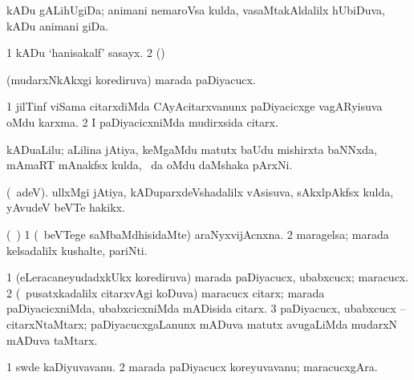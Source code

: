 {{{{{{{\bentry
{} 
\gl{\nA}
\expl{}
\bmng
{} 
\emng
\eentry

\bentry
{} 
\gl{\nA}
\expl{}
\bmng
kADu gALihUgiDa; animani nemaroVsa kulda, vasaMtakAldalilx hUbiDuva, kADu animani giDa. 
\emng
\eentry

\bentry
{} 
\gl{\nA}
\expl{}
\bmng
{} 
\emng
\eentry

\bentry
{} 
\gl{\nA}
\expl{}
\bmng
\bnum
\num{1} kADu `hanisakalf' sasayx. 
\num{2} (\ame)  
\enum
\emng
\eentry

\bentry 
{} 
\gl{\nA}
\expl{}
\bmng
(mudarxNkAkxgi korediruva) marada paDiyacucx. 
\emng
\eentry

\bentry
{} 
\gl{\nA}
\expl{}
\bmng
\bnum
\num{1} jilTinf viSama citarxdiMda CAyAcitarxvanunx paDiyacicxge vagARyisuva oMdu karxma. 
\num{2} I paDiyacicxniMda mudirxsida citarx. 
\enum
\emng
\eentry

\bentry
{} 
\gl{\nA}
\expl{}
\bmng
kADuaLilu; aLilina jAtiya, keMgaMdu matutx baUdu mishirxta baNNxda, mAmaRT mAnakfsx kulda, \kanu\ \ame da oMdu daMshaka pArxNi. 
\emng
\eentry

\bentry
{} 
\gl{\nA}
\expl{}
\bmng
(\bava\ adeV). ullxMgi jAtiya, kADuparxdeVshadalilx vAsisuva, sAkxlpAkfsx kulda, yAvudeV beVTe hakikx. 
\emng
\eentry

\bentry
{} 
\gl{\nA}
\expl{}
\bmng
(\kanmu\ \ame) 
\bnum
\num{1} (\kanmu\ beVTege saMbaMdhisidaMte) araNyxvijAcnxna. 
\num{2} maragelsa; marada kelsadalilx kushalte, pariNti. 
\enum
\emng
\eentry

\bentry
{} 
\gl{\nA}
\expl{}
\bmng
\bnum
\num{1} (eLeracaneyudadxkUkx korediruva) marada paDiyacucx, ubabxcucx; maracucx. 
\num{2} (\kanmu\ pusatxkadalilx citarxvAgi koDuva) maracucx citarx; marada paDiyacicxniMda, ubabxcicxniMda mADisida citarx. 
\num{3} paDiyacucx, ubabxcucx -- citarxNtaMtarx; paDiyacucxgaLanunx mADuva matutx avugaLiMda mudarxN mADuva taMtarx. 
\enum
\emng
\eentry

\bentry
{} 
\gl{\nA}
\expl{}
\bmng
\bnum
\num{1} swde kaDiyuvavanu. 
\num{2} marada paDiyacucx koreyuvavanu; maracucxgAra. 
\enum
\emng
\eentry

}}}}}}}
